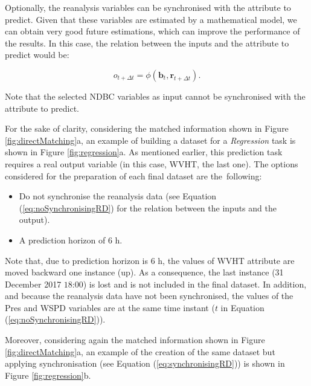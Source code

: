 \documentclass[energies,article,accept,moreauthors,pdftex]{Definitions/mdpi}
\begin{document}
\begin{paracol}{2}
\begin{itemize}
						Optionally, the reanalysis variables can be synchronised with the attribute to predict. Given that these variables are estimated by a mathematical model, we can obtain very good future estimations, which can improve the performance of the results. In this case, the relation between the inputs and the attribute to predict would be:
						\begin{linenomath*}
							\begin{equation}
								o_{t+\Delta t}=\phi(\mathbf{b}_t,\mathbf{r}_{t+\Delta t}).
								\label{eq:synchronisingRD}
							\end{equation}
						\end{linenomath*}
						
						Note that the selected NDBC variables as input cannot be synchronised with the attribute to predict.
						
 						For the sake of clarity, considering the matched information shown in Figure \ref{fig:directMatching}a, an example of building a dataset for a \textit{Regression} task is shown in Figure  \ref{fig:regression}a. As mentioned earlier, this prediction task requires a real output variable (in this case, WVHT, the last one). The options considered for the preparation of each final dataset are \mbox{the following}:
 							\begin{itemize}
 								\item Do not synchronise the reanalysis data (see Equation (\ref{eq:noSynchronisingRD}) for the relation between the inputs and the output).
 								\item A prediction horizon of $6$ h.
 							\end{itemize}
							
 						Note that, due to prediction horizon is $6$ h, the values of WVHT attribute are moved backward one instance (up). As a consequence, the last instance (31 December 2017 $18$:$00$) is lost and is not included in the final dataset. In addition, and because the reanalysis data have not been synchronised, the values of the Pres and WSPD variables are at the same time instant ($t$ in Equation (\ref{eq:noSynchronisingRD})).
						
 						Moreover, considering again the matched information shown in Figure \ref{fig:directMatching}a, an example of the creation of the same dataset but applying synchronisation (see Equation (\ref{eq:synchronisingRD})) is shown in Figure  \ref{fig:regression}b.
						
							


\end{itemize}
\end{paracol}
\end{document}
